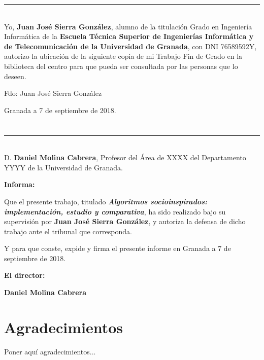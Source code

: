 \noindent\rule[-1ex]{\textwidth}{2pt}\\[4.5ex]

Yo, \textbf{Juan José Sierra González}, alumno de la titulación Grado en Ingeniería Informática de la \textbf{Escuela Técnica Superior
de Ingenierías Informática y de Telecomunicación de la Universidad de Granada}, con DNI 76589592Y, autorizo la
ubicación de la siguiente copia de mi Trabajo Fin de Grado en la biblioteca del centro para que pueda ser
consultada por las personas que lo deseen.

\vspace{6cm}

\noindent Fdo: Juan José Sierra González

\vspace{2cm}

\begin{flushright}
Granada a 7 de septiembre de 2018.
\end{flushright}


\chapter*{}
\thispagestyle{empty}

\noindent\rule[-1ex]{\textwidth}{2pt}\\[4.5ex]

D. \textbf{Daniel Molina Cabrera}, Profesor del Área de XXXX del Departamento YYYY de la Universidad de Granada.

\vspace{0.5cm}

\textbf{Informa:}

\vspace{0.5cm}

Que el presente trabajo, titulado \textit{\textbf{Algoritmos socioinspirados: implementación, estudio y comparativa}},
ha sido realizado bajo su supervisión por \textbf{Juan José Sierra González}, y autoriza la defensa de dicho trabajo ante el tribunal
que corresponda.

\vspace{0.5cm}

Y para que conste, expide y firma el presente informe en Granada a 7 de septiembre de 2018.

\vspace{1cm}

\textbf{El director:}

\vspace{5cm}

\noindent \textbf{Daniel Molina Cabrera}

\chapter*{Agradecimientos}
\thispagestyle{empty}

       \vspace{1cm}


Poner aquí agradecimientos...

